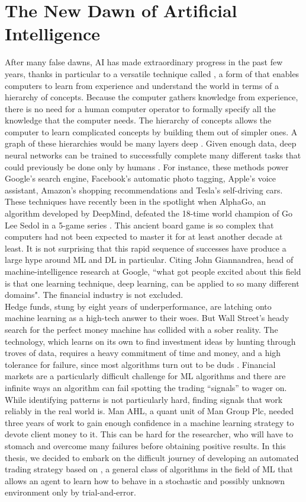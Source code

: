\section{The New Dawn of Artificial Intelligence}
After many false dawns, \gls{AI} has made extraordinary progress in the past few years, thanks in particular to a versatile technique called , a form of  that enables computers to learn from experience and understand the world in terms of a hierarchy of concepts. Because the computer gathers knowledge from experience, there is no need for a human computer operator to formally specify all the knowledge that the computer needs. The hierarchy of concepts allows the computer to learn complicated concepts by building them out of simpler ones. A graph of these hierarchies would be many layers deep \cite{bengio2015deep}. Given enough data, deep neural networks can be trained to successfully complete many different tasks that could previously be done only by humans \cite{economist2016march}. For instance, these methods power Google's search engine, Facebook's automatic photo tagging, Apple's voice assistant, Amazon's shopping recommendations and Tesla's self-driving cars. These techniques have recently been in the spotlight when AlphaGo, an algorithm developed by DeepMind, defeated the 18-time world champion of Go Lee Sedol in a 5-game series \cite{silver2016mastering}. This ancient board game is so complex that computers had not been expected to master it for at least another decade at least. It is not surprising that this rapid sequence of successes have produce a large hype around \gls{ML} and \gls{DL} in particular. Citing John Giannandrea, head of machine-intelligence research at Google, ``what got people excited about this field is that one learning technique, deep learning, can be applied to so many different domains". The financial industry is not excluded.\\
Hedge funds, stung by eight years of underperformance, are latching onto machine learning as a high-tech answer to their woes. But Wall Street’s heady search for the perfect money machine has collided with a sober reality. The technology, which learns on its own to find investment ideas by hunting through troves of data, requires a heavy commitment of time and money, and a high tolerance for failure, since most algorithms turn out to be duds \cite{bloomberg2016ml}. Financial markets are a particularly difficult challenge for \gls{ML} algorithms and there are infinite ways an algorithm can fail spotting the trading ``signals'' to wager on. While identifying patterns is not particularly hard, finding signals that work reliably in the real world is. Man AHL, a quant unit of Man Group Plc, needed three years of work to gain enough confidence in a machine learning strategy to devote client money to it. This can be hard for the researcher, who will have to stomach and overcome many failures before obtaining positive results. In this thesis, we decided to embark on the difficult journey of developing an automated trading strategy based on , a general class of algorithms in the field of \gls{ML} that allows an agent to learn how to behave in a stochastic and possibly unknown environment only by trial-and-error.

